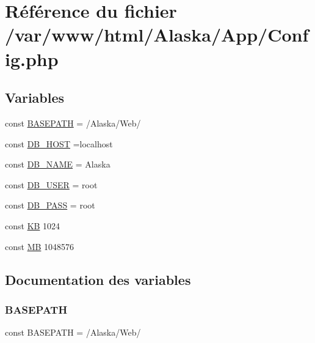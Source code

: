 \hypertarget{_config_8php}{}\section{Référence du fichier /var/www/html/\+Alaska/\+App/\+Config.php}
\label{_config_8php}
\subsection*{Variables}
\begin{DoxyCompactItemize}
\item 
const \hyperlink{_config_8php_ad39801cabfd338dc5524466fe793fda9}{B\+A\+S\+E\+P\+A\+TH} = \textquotesingle{}/Alaska/Web/\textquotesingle{}
\item 
const \hyperlink{_config_8php_a293363d7988627f671958e2d908c202a}{D\+B\+\_\+\+H\+O\+ST} =\textquotesingle{}localhost\textquotesingle{}
\item 
const \hyperlink{_config_8php_ab5db0d3504f917f268614c50b02c53e2}{D\+B\+\_\+\+N\+A\+ME} = \textquotesingle{}Alaska\textquotesingle{}
\item 
const \hyperlink{_config_8php_a1d1d99f8e08f387d84fe9848f3357156}{D\+B\+\_\+\+U\+S\+ER} = \textquotesingle{}root\textquotesingle{}
\item 
const \hyperlink{_config_8php_a8bb9c4546d91667cfa61879d83127a92}{D\+B\+\_\+\+P\+A\+SS} = \textquotesingle{}root\textquotesingle{}
\item 
const \hyperlink{_config_8php_a4f06cdd0c63f3ce691804d6c90ea6c32}{KB} 1024
\item 
const \hyperlink{_config_8php_a91c734126e699a6ba53fe57e06bb8b49}{MB} 1048576
\end{DoxyCompactItemize}


\subsection{Documentation des variables}
\mbox{\label{_config_8php_ad39801cabfd338dc5524466fe793fda9}} 
\subsubsection{\texorpdfstring{B\+A\+S\+E\+P\+A\+TH}{BASEPATH}}
{\footnotesize\ttfamily const B\+A\+S\+E\+P\+A\+TH = \textquotesingle{}/Alaska/Web/\textquotesingle{}}

